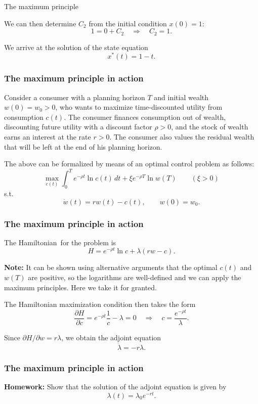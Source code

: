 \documentclass[10pt]{beamer}
\theoremstyle{definition}
\begin{document}
\begin{section}{The maximum principle}
\begin{frame}[fragile]
\begin{example}[cont.]
We can then determine $ C_2 $ from the initial condition $ x(0)=1 $: \[ 1=0+C_2 \quad \Rightarrow \quad C_2 = 1.\]

We arrive at the solution of the state equation \[ x^*(t)=1-t. \]
\end{example}
\end{frame}

\begin{frame}[fragile]
\frametitle{The maximum principle in action}
\begin{example}
Consider a consumer with a planning horizon $ T $ and initial wealth $ w(0)=w_0>0 $, who wants to maximize time-discounted utility from consumption $ c(t) $. The consumer finances consumption out of wealth, discounting future utility with a discount factor $ \rho > 0 $, and the stock of wealth earns an interest at the rate $ r>0 $. The consumer also values the residual wealth that will be left at the end of his planning horizon.\bigskip \pause

The above can be formalized by means of an optimal control problem as follows:
\[ \max_{c(t)}\int_{0}^{T}e^{-\rho t}\ln c(t)\,dt + \xi e^{-\rho T}\ln w(T) \qquad (\xi>0)\]
s.t. \[ \dot{w}(t)=rw(t)-c(t),\qquad w(0)=w_0. \]
\label{ex:OptC}
\end{example}
\end{frame}

\begin{frame}[fragile]
\frametitle{The maximum principle in action}
\addtocounter{theorem}{-1}
\begin{example}[cont.]
The Hamiltonian\ for the problem is 
\[ H = e^{-\rho t}\ln c+\lambda (rw-c). \]

\textbf{Note:} It can be shown using alternative arguments that the optimal $ c(t) $ and $ w(T) $ are positive, so the logarithms are well-defined and we can apply the maximum principles. Here we take it for granted.\bigskip

The Hamiltonian maximization condition then takes the form \[ \dfrac{\partial H}{\partial c} = e^{-\rho t}\dfrac{1}{c}-\lambda = 0 \quad \Rightarrow \quad c = \dfrac{e^{-\rho t}}{\lambda}.\]

Since $ \partial H / \partial w  = r\lambda$, we obtain the adjoint equation \[ \dot{\lambda} = -r\lambda. \]
\end{example}
\end{frame}

\begin{frame}[fragile]
\frametitle{The maximum principle in action}
\addtocounter{theorem}{-1}
\begin{example}[cont.]
\textbf{Homework:} Show that the solution of the adjoint equation is given by \[ \lambda(t)=\lambda_0 e^{-rt}. \]\bigskip


\end{example}
\end{frame}
\end{section}
\end{document}
